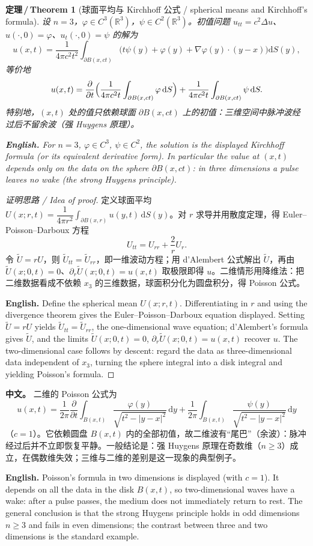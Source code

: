 \documentclass[UTF8,11pt,a4paper]{ctexart}
\newcommand{\APS}[2]{\par\noindent\textbf{中文。} #1\par\noindent\textbf{English.} #2\par\smallskip}
\newcommand{\EN}[1]{\par\noindent \textbf{English.} #1\par}
\newtheorem{theorem}[definition]{定理\,/\,Theorem}
\newcommand{\R}{\mathbb{R}}
\newcommand{\dd}{\mathrm{d}}
\begin{document}
\begin{theorem}[球面平均与 Kirchhoff 公式 / spherical means and Kirchhoff's formula]\label{thm:kirchhoff}
设 $n=3$，$\varphi\in C^3(\R^3)$，$\psi\in C^2(\R^3)$。初值问题 $u_{tt}=c^2\Delta u$、$u(\cdot,0)=\varphi$、$u_t(\cdot,0)=\psi$ 的解为
\[
u(x,t)=\frac{1}{4\pi c^2t^2}\int_{\partial B(x,ct)}\bigl(t\psi(y)+\varphi(y)+\nabla\varphi(y)\cdot(y-x)\bigr)\dd S(y),
\]
等价地
\[
u(x,t)=\frac{\partial}{\partial t}\Bigl(\frac{1}{4\pi c^2t}\int_{\partial B(x,ct)}\varphi\,\dd S\Bigr)
+\frac{1}{4\pi c^2t}\int_{\partial B(x,ct)}\psi\,\dd S .
\]
特别地，$(x,t)$ 处的值只依赖球面 $\partial B(x,ct)$ 上的初值：三维空间中脉冲波经过后不留余波（强 Huygens 原理）。
\EN{For $n=3$, $\varphi\in C^3$, $\psi\in C^2$, the solution is the displayed Kirchhoff formula (or its equivalent derivative form). In particular the value at $(x,t)$ depends only on the data on the sphere $\partial B(x,ct)$: in three dimensions a pulse leaves no wake (the strong Huygens principle).}
\end{theorem}

\begin{proof}[证明思路 / Idea of proof]
定义球面平均 $U(x;r,t)=\dfrac{1}{4\pi r^2}\displaystyle\int_{\partial B(x,r)}u(y,t)\,\dd S(y)$。对 $r$ 求导并用散度定理，得 Euler--Poisson--Darboux 方程
\[
U_{tt}=U_{rr}+\frac{2}{r}U_r .
\]
令 $\widetilde U=rU$，则 $\widetilde U_{tt}=\widetilde U_{rr}$，即一维波动方程；用 d'Alembert 公式解出 $\widetilde U$，再由 $\widetilde U(x;0,t)=0$、$\partial_r\widetilde U(x;0,t)=u(x,t)$ 取极限即得 $u$。二维情形用降维法：把二维数据看成不依赖 $x_3$ 的三维数据，球面积分化为圆盘积分，得 Poisson 公式。\EN{Define the spherical mean $U(x;r,t)$. Differentiating in $r$ and using the divergence theorem gives the Euler--Poisson--Darboux equation displayed. Setting $\widetilde U=rU$ yields $\widetilde U_{tt}=\widetilde U_{rr}$, the one-dimensional wave equation; d'Alembert's formula gives $\widetilde U$, and the limits $\widetilde U(x;0,t)=0$, $\partial_r\widetilde U(x;0,t)=u(x,t)$ recover $u$. The two-dimensional case follows by descent: regard the data as three-dimensional data independent of $x_3$, turning the sphere integral into a disk integral and yielding Poisson's formula.}
\end{proof}

\APS{二维的 Poisson 公式为
\[
u(x,t)=\frac{1}{2\pi}\frac{\partial}{\partial t}\int_{B(x,t)}\frac{\varphi(y)}{\sqrt{t^2-|y-x|^2}}\,\dd y
+\frac{1}{2\pi}\int_{B(x,t)}\frac{\psi(y)}{\sqrt{t^2-|y-x|^2}}\,\dd y
\]
（$c=1$）。它依赖圆盘 $B(x,t)$ 内的全部初值，故二维波有``尾巴''（余波）：脉冲经过后并不立即恢复平静。一般结论是：强 Huygens 原理在奇数维（$n\ge3$）成立，在偶数维失效；三维与二维的差别是这一现象的典型例子。}{Poisson's formula in two dimensions is displayed (with $c=1$). It depends on all the data in the disk $B(x,t)$, so two-dimensional waves have a wake: after a pulse passes, the medium does not immediately return to rest. The general conclusion is that the strong Huygens principle holds in odd dimensions $n\ge3$ and fails in even dimensions; the contrast between three and two dimensions is the standard example.}
\end{document}
